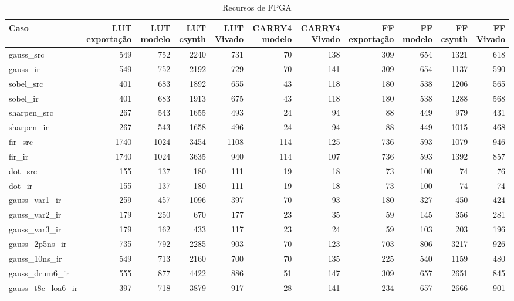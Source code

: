 \begin{table}[htbp]
\centering
\caption{Recursos de FPGA}
\begin{tabular}{|l|r|r|r|r|r|r|r|r|r|r|}
\hline
\rowcolor{tabAzul}\color{white}Caso & \color{white}LUT exportação & \color{white}LUT modelo & \color{white}LUT csynth & \color{white}LUT Vivado & \color{white}CARRY4 modelo & \color{white}CARRY4 Vivado & \color{white}FF exportação & \color{white}FF modelo & \color{white}FF csynth & \color{white}FF Vivado \\
\hline
gauss\_src & 549 & 752 & 2240 & 731 & 70 & 138 & 309 & 654 & 1321 & 618 \\ \hline
gauss\_ir & 549 & 752 & 2192 & 729 & 70 & 141 & 309 & 654 & 1137 & 590 \\ \hline
sobel\_src & 401 & 683 & 1892 & 655 & 43 & 118 & 180 & 538 & 1206 & 565 \\ \hline
sobel\_ir & 401 & 683 & 1913 & 675 & 43 & 118 & 180 & 538 & 1288 & 568 \\ \hline
sharpen\_src & 267 & 543 & 1655 & 493 & 24 & 94 & 88 & 449 & 979 & 431 \\ \hline
sharpen\_ir & 267 & 543 & 1658 & 496 & 24 & 94 & 88 & 449 & 1015 & 468 \\ \hline
fir\_src & 1740 & 1024 & 3454 & 1108 & 114 & 125 & 736 & 593 & 1079 & 946 \\ \hline
fir\_ir & 1740 & 1024 & 3635 & 940 & 114 & 107 & 736 & 593 & 1392 & 857 \\ \hline
dot\_src & 155 & 137 & 180 & 111 & 19 & 18 & 73 & 100 & 74 & 76 \\ \hline
dot\_ir & 155 & 137 & 180 & 111 & 19 & 18 & 73 & 100 & 74 & 74 \\ \hline
gauss\_var1\_ir & 259 & 457 & 1096 & 397 & 70 & 93 & 180 & 327 & 450 & 424 \\ \hline
gauss\_var2\_ir & 179 & 250 & 670 & 177 & 23 & 35 & 59 & 145 & 356 & 281 \\ \hline
gauss\_var3\_ir & 179 & 162 & 433 & 117 & 23 & 24 & 59 & 103 & 203 & 196 \\ \hline
gauss\_2p5ns\_ir & 735 & 792 & 2285 & 903 & 70 & 123 & 703 & 806 & 3217 & 926 \\ \hline
gauss\_10ns\_ir & 549 & 713 & 2160 & 700 & 70 & 135 & 225 & 540 & 1159 & 480 \\ \hline
gauss\_drum6\_ir & 555 & 877 & 4422 & 886 & 51 & 147 & 309 & 657 & 2651 & 845 \\ \hline
gauss\_t8c\_loa6\_ir & 397 & 718 & 3879 & 917 & 28 & 141 & 234 & 657 & 2666 & 901 \\ \hline

\end{tabular}
\end{table}

